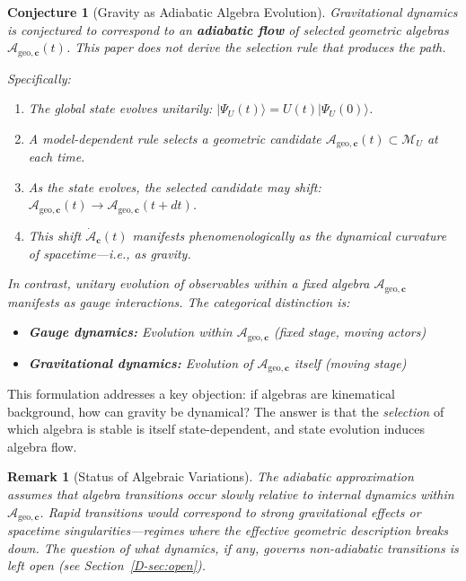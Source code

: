 \documentclass[12pt,a4paper,openany]{book}
\newtheorem{remark}[theorem]{Remark}
\newtheorem{conjecture}[theorem]{Conjecture}
\begin{document}
\begin{conjecture}[Gravity as Adiabatic Algebra Evolution]
\label{D-conj:main}
Gravitational dynamics is conjectured to correspond to an \textbf{adiabatic flow} of selected geometric algebras $\mathcal{A}_{\mathrm{geo},\mathbf{c}}(t)$.  This paper does not derive the selection rule that produces the path.

Specifically:
\begin{enumerate}
    \item The global state evolves unitarily: $|\Psi_U(t)\rangle = U(t)|\Psi_U(0)\rangle$.
    \item A model-dependent rule selects a geometric candidate $\mathcal{A}_{\mathrm{geo},\mathbf{c}}(t)\subset\mathcal M_U$ at each time.
    \item As the state evolves, the selected candidate may shift: $\mathcal{A}_{\mathrm{geo},\mathbf{c}}(t) \to \mathcal{A}_{\mathrm{geo},\mathbf{c}}(t + dt)$.
    \item This shift $\dot{\mathcal{A}}_{\mathbf{c}}(t)$ manifests phenomenologically as the dynamical curvature of spacetime—i.e., as gravity.
\end{enumerate}

In contrast, unitary evolution of observables \emph{within} a fixed algebra $\mathcal{A}_{\mathrm{geo},\mathbf{c}}$ manifests as gauge interactions. The categorical distinction is:
\begin{itemize}
    \item \textbf{Gauge dynamics:} Evolution within $\mathcal{A}_{\mathrm{geo},\mathbf{c}}$ (fixed stage, moving actors)
    \item \textbf{Gravitational dynamics:} Evolution of $\mathcal{A}_{\mathrm{geo},\mathbf{c}}$ itself (moving stage)
\end{itemize}
\end{conjecture}

This formulation addresses a key objection: if algebras are kinematical background, how can gravity be dynamical? The answer is that the \emph{selection} of which algebra is stable is itself state-dependent, and state evolution induces algebra flow.

\begin{remark}[Status of Algebraic Variations]
The adiabatic approximation assumes that algebra transitions occur slowly relative to internal dynamics within $\mathcal{A}_{\mathrm{geo},\mathbf{c}}$. Rapid transitions would correspond to strong gravitational effects or spacetime singularities—regimes where the effective geometric description breaks down. The question of what dynamics, if any, governs non-adiabatic transitions is left open (see Section~\ref{D-sec:open}).
\end{remark}
\end{document}
